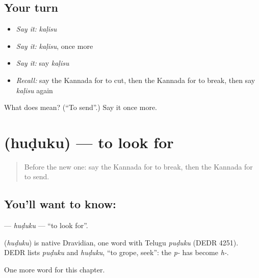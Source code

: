 \subsection*{Your turn}
\begin{itemize}
\raggedright
  \item \emph{Say it:} \emph{kaḷisu}
  \item \emph{Say it:} \emph{kaḷisu}, once more
  \item \emph{Say it:} say \emph{kaḷisu}
  \item \emph{Recall:} say the Kannada for to cut, then the Kannada for to break, then say \emph{kaḷisu} again
\end{itemize}

\begin{tcolorbox}[breakable,colback=teal!4,colframe=teal!35!black,title={Before you move on}]
What does  mean? (\textquotedblleft{}To send\textquotedblright{}.) Say it once more.
\end{tcolorbox}
\section[\texorpdfstring{\kn{ಹುಡುಕು} (huḍuku)}{ಹುಡುಕು (huḍuku)}]{ (huḍuku) — to look for}

\label{lesson:KA-C148-huduku}



\begin{quote}
Before the new one: say the Kannada for to break, then the Kannada for to send.
\end{quote}

\subsection*{You'll want to know: }
\textbf{} — \emph{huḍuku} — \textquotedblleft{}to look for\textquotedblright{}.

\begin{cousinweb}
\textbf{} (\emph{huḍuku}) is native Dravidian, one word with Telugu \emph{puḍuku} (DEDR 4251). DEDR lists \emph{puḍuku} and \emph{huḍuku}, \textquotedblleft{}to grope, seek\textquotedblright{}: the \emph{p-} has become \emph{h-}.
\end{cousinweb}

\begin{grammarlens}[title={What you've built}]
One more word for this chapter.
\end{grammarlens}

